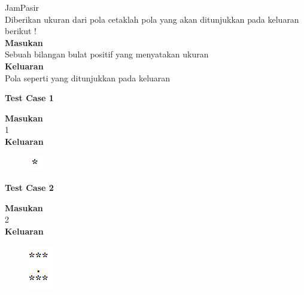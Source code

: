 \newpage
\begin{permasalahan}{JamPasir}\\
\label{prob:JamPasir}
	Diberikan ukuran dari pola cetaklah pola yang akan ditunjukkan pada keluaran berikut ! \\
	\textbf{Masukan}\\
	Sebuah bilangan bulat positif yang menyatakan ukuran\\
	\textbf{Keluaran}\\
	Pola seperti yang ditunjukkan pada keluaran\\
	\begin{center}
	\textbf{Test Case 1}\\
	\end{center}
	\textbf{Masukan}\\
	1\\
	\textbf{Keluaran}\\
		\begin{figure}[h!]
		\includegraphics{fig/JamPasir/1.png}	
		\end{figure}

	\begin{center}
	\textbf{Test Case 2}\\
	\end{center}
	\textbf{Masukan}\\
	2\\
	\textbf{Keluaran}
		\begin{figure}[h!]
		\includegraphics{fig/JamPasir/2.png}	
		\end{figure}


\end{permasalahan}
